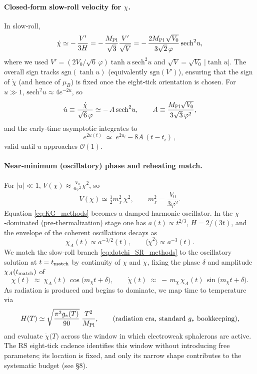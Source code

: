 \documentclass[11pt]{article}
\begin{document}
\paragraph{Closed‑form slow‑roll velocity for \(\chi\).}
In slow‑roll,
\[
  \dot\chi \simeq -\,\frac{V'}{3H}
  = -\,\frac{M_{\rm Pl}}{\sqrt{3}}\frac{V'}{\sqrt{V}}
  = -\,\frac{2 M_{\rm Pl}\,\sqrt{V_0}}{3\sqrt{2}\,\varphi}\,\mathrm{sech}^2 u,
  \label{eq:dotchi_SR_methods}
\]
where we used \(V'=(2V_0/\sqrt{6}\,\varphi)\tanh u\,\mathrm{sech}^2u\) and \(\sqrt{V}=\sqrt{V_0}\,|\tanh u|\).
The overall sign tracks \(\mathrm{sgn}(\tanh u)\) (equivalently \(\mathrm{sgn}(V')\)), ensuring that the sign of \(\dot\chi\) (and hence of \(\mu_B\)) is fixed once the eight‑tick orientation is chosen.
For \(u\gg 1\), \(\mathrm{sech}^2u\approx 4e^{-2u}\), so
\[
  \dot u \equiv \frac{\dot\chi}{\sqrt{6}\,\varphi}
  \simeq -\,A\,\mathrm{sech}^2u,\qquad
  A\equiv \frac{M_{\rm Pl}\sqrt{V_0}}{3\sqrt{3}\,\varphi^2},
\]
and the early‑time asymptotic integrates to
\begin{equation}
  e^{2u(t)} \;\simeq\; e^{2u_i} - 8A\,(t-t_i)\,,
  \label{eq:u_asymptotic}
\end{equation}
valid until \(u\) approaches \(\mathcal{O}(1)\).

\paragraph{Near‑minimum (oscillatory) phase and reheating match.}
For \(|u|\ll 1\), \(V(\chi)\approx \frac{V_0}{6\varphi^2}\chi^2\), so
\begin{equation}
  V(\chi)\simeq \tfrac12 m_\chi^2\,\chi^2,\qquad m_\chi^2=\frac{V_0}{3\varphi^2}.
  \label{eq:mchi_methods}
\end{equation}
Equation \eqref{eq:KG_methods} becomes a damped harmonic oscillator. In the \(\chi\)‑dominated (pre‑thermalization) stage one has \(a(t)\propto t^{2/3}\), \(H=2/(3t)\), and the envelope of the coherent oscillations decays as
\[
  \chi_A(t)\propto a^{-3/2}(t),\qquad
  \langle\dot\chi^2\rangle \propto a^{-3}(t).
\]
We match the slow‑roll branch \eqref{eq:dotchi_SR_methods} to the oscillatory solution at \(t=t_{\rm match}\) by continuity of \(\chi\) and \(\dot\chi\), fixing the phase \(\delta\) and amplitude \(\chi_A(t_{\rm match})\) of
\[
  \chi(t)\;\approx\; \chi_A(t)\,\cos\!\big(m_\chi t+\delta\big),\qquad
  \dot\chi(t)\;\approx\; -\,m_\chi\,\chi_A(t)\,\sin\!\big(m_\chi t+\delta\big).
\]
As radiation is produced and begins to dominate, we map time to temperature via
\begin{equation}
  H(T)\simeq \sqrt{\frac{\pi^2 g_\ast(T)}{90}}\;\frac{T^2}{M_{\rm Pl}},\qquad
  \text{(radiation era, standard \(g_\ast\) bookkeeping),}
  \label{eq:H_of_T_methods}
\end{equation}
and evaluate \(\dot\chi\big(T\big)\) across the window in which electroweak sphalerons are active. The RS eight‑tick cadence identifies this window without introducing free parameters; its location is fixed, and only its narrow shape contributes to the systematic budget (see §8).
\end{document}
